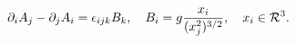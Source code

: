 \begin{equation}
\partial_i A_j-\partial_j A_i=\epsilon_{ijk}B_k,\quad
B_i=g\frac{x_i}{(x_j^2)^{3/2}},\quad
x_i\in {\cal R}^3.
\label{amon}
\end{equation}

